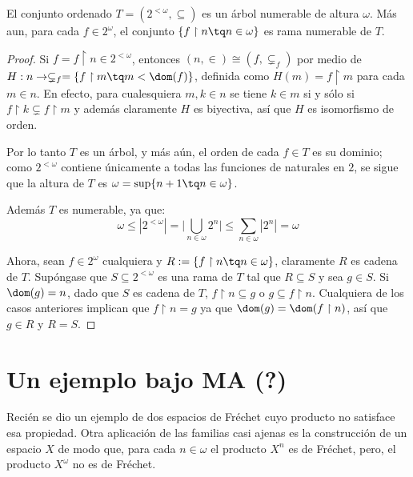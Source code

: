 
\begin{lema}
		El conjunto ordenado $T=(2^{<\omega}, \subseteq)$ es un árbol numerable de altura $\omega$. Más aun, para cada $f \in 2^\omega$, el conjunto $\{ f \upharpoonright n \tq n \in \omega \}$ es rama numerable de $T$.
	\end{lema}
	
	\begin{proof}
		Si $f=f \upharpoonright n \in 2^{<\omega}$, entonces $(n,\in) \cong (f, \subsetneq_f)$ por medio de $H:n \to \subsetneq_f=\{ f \upharpoonright m \tq m < \dom(f) \}$, definida como $H(m)=f \upharpoonright m$ para cada $m \in n$. En efecto, para cualesquiera $m,k \in n$ se tiene $k \in m$ si y sólo si $f \upharpoonright k \subsetneq f \upharpoonright m$ y además claramente $H$ es biyectiva, así que $H$ es isomorfismo de orden.
	
		Por lo tanto $T$ es un árbol, y más aún, el orden de cada $f \in T$ es su dominio; como $2^{<\omega}$ contiene únicamente a todas las funciones de naturales en $2$, se sigue que la altura de $T$ es $\omega = \sup\{ n+1 \tq n \in \omega \}$. 
		
		Además $T$ es numerable, ya que:
		$$ \omega \leq |2^{<\omega}| = \Big| \bigcup_{n \in \omega} 2^n \Big| \leq \sum_{n \in \omega} |2^n| = \omega $$
		
		Ahora, sean $f \in 2^\omega$ cualquiera y $R:=\{ f \upharpoonright n \tq n \in \omega \}$, claramente $R$ es cadena de $T$. Supóngase que $S \subseteq 2^{<\omega}$ es una rama de $T$ tal que $R \subseteq S$ y sea $g \in S$. Si $\dom(g)=n$, dado que $S$ es cadena de $T$, $f \upharpoonright n \subseteq g$ o $g \subseteq f \upharpoonright n$. Cualquiera de los casos anteriores implican que $f \upharpoonright n = g$ ya que $\dom(g)=\dom(f \upharpoonright n)$, así que $g \in R$ y $R = S$. 
	\end{proof}


\newpage

\section{Un ejemplo bajo MA (?)}

	Recién se dio un ejemplo de dos espacios de Fréchet cuyo producto no satisface esa propiedad. Otra aplicación de las familias casi ajenas es la construcción de un espacio $X$ de modo que, para cada $n \in \omega$ el producto $X^n$ es de Fréchet, pero, el producto $X^\omega$ no es de Fréchet.

